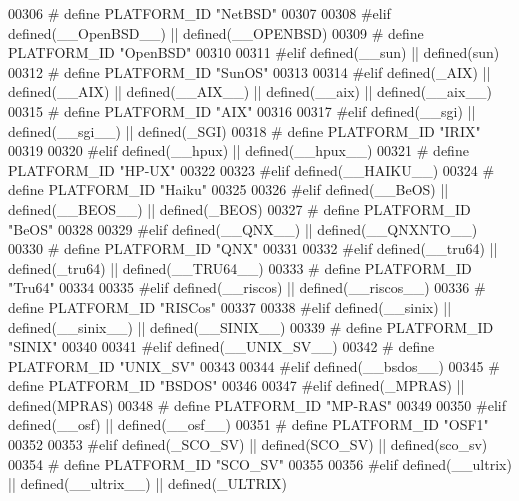 \begin{DoxyCode}
{{{{{{{{{{{{{{{{{{{{{{{{{{{{{{{{{{{00306 \textcolor{preprocessor}{# define PLATFORM\_ID "NetBSD"}
00307 
00308 \textcolor{preprocessor}{#elif defined(\_\_OpenBSD\_\_) || defined(\_\_OPENBSD)}
00309 \textcolor{preprocessor}{# define PLATFORM\_ID "OpenBSD"}
00310 
00311 \textcolor{preprocessor}{#elif defined(\_\_sun) || defined(sun)}
00312 \textcolor{preprocessor}{# define PLATFORM\_ID "SunOS"}
00313 
00314 \textcolor{preprocessor}{#elif defined(\_AIX) || defined(\_\_AIX) || defined(\_\_AIX\_\_) || defined(\_\_aix) || defined(\_\_aix\_\_)}
00315 \textcolor{preprocessor}{# define PLATFORM\_ID "AIX"}
00316 
00317 \textcolor{preprocessor}{#elif defined(\_\_sgi) || defined(\_\_sgi\_\_) || defined(\_SGI)}
00318 \textcolor{preprocessor}{# define PLATFORM\_ID "IRIX"}
00319 
00320 \textcolor{preprocessor}{#elif defined(\_\_hpux) || defined(\_\_hpux\_\_)}
00321 \textcolor{preprocessor}{# define PLATFORM\_ID "HP-UX"}
00322 
00323 \textcolor{preprocessor}{#elif defined(\_\_HAIKU\_\_)}
00324 \textcolor{preprocessor}{# define PLATFORM\_ID "Haiku"}
00325 
00326 \textcolor{preprocessor}{#elif defined(\_\_BeOS) || defined(\_\_BEOS\_\_) || defined(\_BEOS)}
00327 \textcolor{preprocessor}{# define PLATFORM\_ID "BeOS"}
00328 
00329 \textcolor{preprocessor}{#elif defined(\_\_QNX\_\_) || defined(\_\_QNXNTO\_\_)}
00330 \textcolor{preprocessor}{# define PLATFORM\_ID "QNX"}
00331 
00332 \textcolor{preprocessor}{#elif defined(\_\_tru64) || defined(\_tru64) || defined(\_\_TRU64\_\_)}
00333 \textcolor{preprocessor}{# define PLATFORM\_ID "Tru64"}
00334 
00335 \textcolor{preprocessor}{#elif defined(\_\_riscos) || defined(\_\_riscos\_\_)}
00336 \textcolor{preprocessor}{# define PLATFORM\_ID "RISCos"}
00337 
00338 \textcolor{preprocessor}{#elif defined(\_\_sinix) || defined(\_\_sinix\_\_) || defined(\_\_SINIX\_\_)}
00339 \textcolor{preprocessor}{# define PLATFORM\_ID "SINIX"}
00340 
00341 \textcolor{preprocessor}{#elif defined(\_\_UNIX\_SV\_\_)}
00342 \textcolor{preprocessor}{# define PLATFORM\_ID "UNIX\_SV"}
00343 
00344 \textcolor{preprocessor}{#elif defined(\_\_bsdos\_\_)}
00345 \textcolor{preprocessor}{# define PLATFORM\_ID "BSDOS"}
00346 
00347 \textcolor{preprocessor}{#elif defined(\_MPRAS) || defined(MPRAS)}
00348 \textcolor{preprocessor}{# define PLATFORM\_ID "MP-RAS"}
00349 
00350 \textcolor{preprocessor}{#elif defined(\_\_osf) || defined(\_\_osf\_\_)}
00351 \textcolor{preprocessor}{# define PLATFORM\_ID "OSF1"}
00352 
00353 \textcolor{preprocessor}{#elif defined(\_SCO\_SV) || defined(SCO\_SV) || defined(sco\_sv)}
00354 \textcolor{preprocessor}{# define PLATFORM\_ID "SCO\_SV"}
00355 
00356 \textcolor{preprocessor}{#elif defined(\_\_ultrix) || defined(\_\_ultrix\_\_) || defined(\_ULTRIX)}
}}}}}}}}}}}}}}}}}}}}}}}}}}}}}}}}}}}
\end{DoxyCode}
